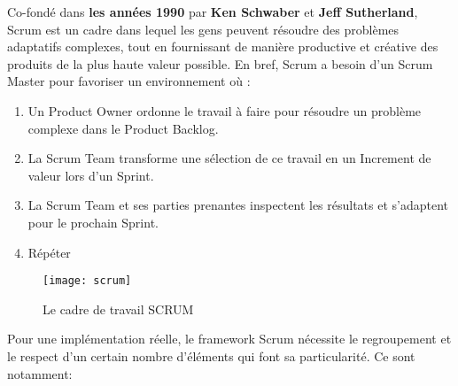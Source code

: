         Co-fondé dans \textbf{les années 1990} par \textbf{Ken Schwaber} et \textbf{Jeff Sutherland}, Scrum est un cadre dans lequel les gens peuvent résoudre des problèmes adaptatifs complexes, tout en fournissant de manière productive et créative des produits de la plus haute valeur possible. En bref, Scrum a besoin d'un Scrum Master pour favoriser un environnement où : 
            \begin{enumerate}
                \item Un Product Owner ordonne le travail à faire pour résoudre un problème complexe dans le Product Backlog. 
                \item La Scrum Team transforme une sélection de ce travail en un Increment de valeur lors d'un Sprint. 
                \item La Scrum Team et ses parties prenantes inspectent les résultats et s'adaptent pour le prochain Sprint. 
                \item Répéter
            \end{enumerate}
            \begin{figure}[H]
                \centering
                \texttt{[image: scrum]}
                \caption{Le cadre de travail SCRUM}
            \end{figure}
        Pour une implémentation réelle, le framework Scrum nécessite le regroupement et le respect d’un certain nombre d'éléments qui font sa particularité. Ce sont notamment:

